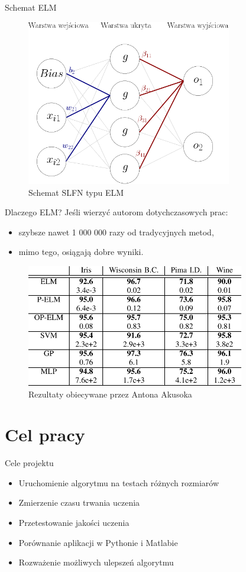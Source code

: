 \documentclass{beamer}
\begin{document}
\begin{frame}{Schemat ELM}
\begin{figure}[H]
\centering
\includegraphics[width=0.8\textwidth]{schemat_sieci.png}
\caption{Schemat SLFN typu ELM}
\end{figure}
\end{frame}
\begin{frame}{Dlaczego ELM?}
Jeśli wierzyć autorom dotychczasowych prac:
\begin{itemize}
\item szybsze nawet 1 000 000 razy od tradycyjnych metod,
\item mimo tego, osiągają dobre wyniki.
\end{itemize}
\begin{figure}[H]
\centering
\includegraphics[width=0.85\textwidth]{obiecywane_rezultaty.png}
\caption{Rezultaty obiecywane przez Antona Akusoka}
\end{figure}
\end{frame}
\section{Cel pracy}
\begin{frame}{Cele projektu}
\begin{itemize}
\item Uruchomienie algorytmu na testach różnych rozmiarów
\item Zmierzenie czasu trwania uczenia
\item Przetestowanie jakości uczenia
\item Porównanie aplikacji w Pythonie i Matlabie
\item Rozważenie możliwych ulepszeń algorytmu
\end{itemize}
\end{frame}
\end{document}
